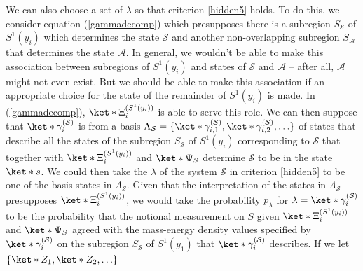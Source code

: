 \documentclass[12pt]{report}
\providecommand{\DIFaddbegin}{} %
\providecommand{\DIFaddend}{} %
\providecommand{\DIFdelbegin}{} %
\providecommand{\DIFdelend}{} %
\begin{document}
We can also choose a set of $\lambda$ so that criterion \ref{hidden5} holds. To do this, we consider equation (\ref{gammadecomp}) which presupposes there is a subregion $S_{\mathcal{S}}$ of $S^1(y_i)$ which determines the state $\mathcal{S}$ and another non-overlapping subregion $S_{\mathcal{A}}$ that determines the state $\mathcal{A}$. In general, we wouldn't be able to make this association between subregions of $S^1(y_i)$ and states of  $\mathcal{S}$  and $\mathcal{A}$ -- after all, $\mathcal{A}$ might not even exist. But we should be able to make this association if an appropriate choice for the state of the remainder of $S^1(y_i)$ is made. In (\ref{gammadecomp}), $\ket*{\Xi_i^{(S^1(y_i))}}$ is able to serve this role. We can then suppose that $\ket*{\gamma_i^{(\mathcal{S})}}$ is from a basis $\Lambda_{\mathcal{S}}=\{\ket*{\gamma_{i,1}^{(\mathcal{S})}},\ket*{\gamma_{i,2}^{(\mathcal{S})}},\ldots\}$%
%
 of states that describe all the states of the subregion $S_{\mathcal{S}}$ of $S^1(y_i)$ corresponding to $\mathcal{S}$ that together with $\ket*{\Xi_i^{(S^1(y_i))}}$ and $\ket*{\Psi_S}$ determine $\mathcal{S}$ to be in the state $\ket*{s}$. We could then take the $\lambda$ of the system $\mathcal{S}$ in criterion \ref{hidden5} to be one of the basis states in $\Lambda_{\mathcal{S}}$. Given that the interpretation of the states in $\Lambda_{\mathcal{S}}$ presupposes $\ket*{\Xi_i^{(S^1(y_i))}}$, we would take the probability $p_\lambda$ for $\lambda = \ket*{\gamma_i^{(\mathcal{S})}}$ to be the probability that the notional measurement on $S$ given $\ket*{\Xi_i^{(S^1(y_i))}}$ and $\ket*{\Psi_S}$ agreed with the mass-energy density values specified by $ \ket*{\gamma_i^{(\mathcal{S})}}$ on the subregion $S_{\mathcal{S}}$ of $S^1(y_1)$ that $ \ket*{\gamma_i^{(\mathcal{S})}}$ describes. If we let $\{\ket*{Z_1}, \ket*{Z_2},\ldots  \}$ %
 \DIFdelbegin %
\DIFdelend \DIFaddbegin {}\DIFaddend %
\end{document}
